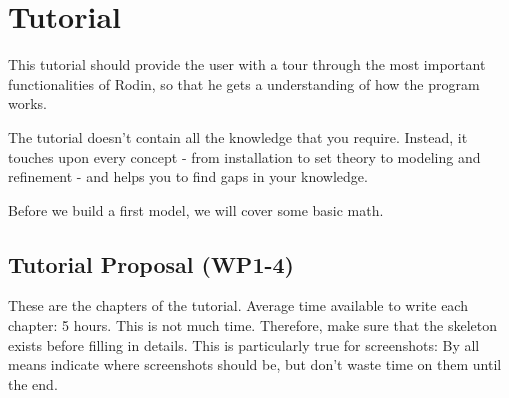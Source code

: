 \chapter{Tutorial}
\label{tutorial}

This tutorial should provide the user with a tour through the most important functionalities of Rodin, so that he gets a understanding of how the program works.

The tutorial doesn't contain all the knowledge that you require.  Instead, it touches upon every concept - from installation to set theory to modeling and refinement - and helps you to find gaps in your knowledge.

Before we build a first model, we will cover some basic math.

\section{Tutorial Proposal (WP1-4)}

These are the chapters of the tutorial.  Average time available to write each chapter: 5 hours.  This is not much time.  Therefore, make sure that the skeleton exists before filling in details.
This is particularly true for screenshots: By all means indicate where screenshots should be, but don't waste time on them until the end.


